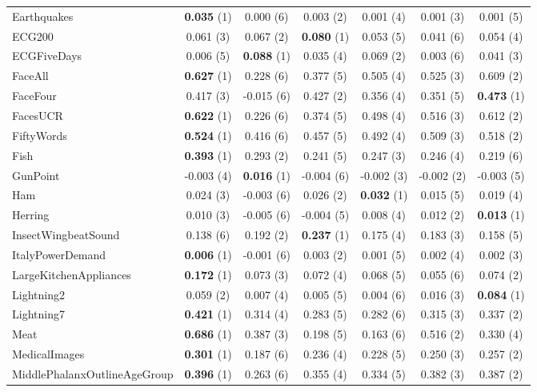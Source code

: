 \begin{table}[ht]
\begin{adjustbox}{width=\textwidth}
\begin{tabular}{lcccccc}
    Earthquakes & \textbf{0.035} (1) & 0.000 (6) & 0.003 (2) & 0.001 (4) & 0.001 (3) & 0.001 (5) \\
    ECG200 & 0.061 (3) & 0.067 (2) & \textbf{0.080} (1) & 0.053 (5) & 0.041 (6) & 0.054 (4) \\
    ECGFiveDays & 0.006 (5) & \textbf{0.088} (1) & 0.035 (4) & 0.069 (2) & 0.003 (6) & 0.041 (3) \\
    FaceAll & \textbf{0.627} (1) & 0.228 (6) & 0.377 (5) & 0.505 (4) & 0.525 (3) & 0.609 (2) \\
    FaceFour & 0.417 (3) & -0.015 (6) & 0.427 (2) & 0.356 (4) & 0.351 (5) & \textbf{0.473} (1) \\
    FacesUCR & \textbf{0.622} (1) & 0.226 (6) & 0.374 (5) & 0.498 (4) & 0.516 (3) & 0.612 (2) \\
    FiftyWords & \textbf{0.524} (1) & 0.416 (6) & 0.457 (5) & 0.492 (4) & 0.509 (3) & 0.518 (2) \\
    Fish & \textbf{0.393} (1) & 0.293 (2) & 0.241 (5) & 0.247 (3) & 0.246 (4) & 0.219 (6) \\
    GunPoint & -0.003 (4) & \textbf{0.016} (1) & -0.004 (6) & -0.002 (3) & -0.002 (2) & -0.003 (5) \\
    Ham & 0.024 (3) & -0.003 (6) & 0.026 (2) & \textbf{0.032} (1) & 0.015 (5) & 0.019 (4) \\
    Herring & 0.010 (3) & -0.005 (6) & -0.004 (5) & 0.008 (4) & 0.012 (2) & \textbf{0.013} (1) \\
    InsectWingbeatSound & 0.138 (6) & 0.192 (2) & \textbf{0.237} (1) & 0.175 (4) & 0.183 (3) & 0.158 (5) \\
    ItalyPowerDemand & \textbf{0.006} (1) & -0.001 (6) & 0.003 (2) & 0.001 (5) & 0.002 (4) & 0.002 (3) \\
    LargeKitchenAppliances & \textbf{0.172} (1) & 0.073 (3) & 0.072 (4) & 0.068 (5) & 0.055 (6) & 0.074 (2) \\
    Lightning2 & 0.059 (2) & 0.007 (4) & 0.005 (5) & 0.004 (6) & 0.016 (3) & \textbf{0.084} (1) \\
    Lightning7 & \textbf{0.421} (1) & 0.314 (4) & 0.283 (5) & 0.282 (6) & 0.315 (3) & 0.337 (2) \\
    Meat & \textbf{0.686} (1) & 0.387 (3) & 0.198 (5) & 0.163 (6) & 0.516 (2) & 0.330 (4) \\
    MedicalImages & \textbf{0.301} (1) & 0.187 (6) & 0.236 (4) & 0.228 (5) & 0.250 (3) & 0.257 (2) \\
    MiddlePhalanxOutlineAgeGroup & \textbf{0.396} (1) & 0.263 (6) & 0.355 (4) & 0.334 (5) & 0.382 (3) & 0.387 (2) \\

\end{tabular}
\end{adjustbox}
\end{table}
